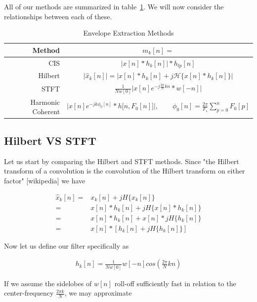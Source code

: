 \documentclass [11pt, proquest,oneside] {ganter_thesis}[2015/03/03]
\begin{document}
All of our methods are summarized in table~\ref{table:envelope_extraction_methods}.  We will now consider the relationships between each of these.

\begin{table}
\begin{center}
\begin{tabular}{| r | c |}
  \hline
  \textbf{Method} & $m_k[n] = $ \\ \hline
  CIS & $\Big| x[n] * h_k[n] \Big| * h_{lp}[n]$ \\ \hline
  Hilbert & $\Big| \widehat{x}_k[n] \Big| = \Big| x[n] * h_k[n] + j\mathcal{H}\{x[n] * h_k[n]\} \Big|$ \\ \hline
  STFT & $\frac{1}{Nw[0]}  \Big\vert x[n] e^{-j\frac{2\pi}{N}kn} * w[-n] \Big\vert$ \\ \hline
  Harmonic Coherent & $\Big| x[n] e^{-jk\phi_0 [n]} * h\big[n, F_0[n] \big] \Big|, \qquad \phi_0[n] = \frac{2\pi}{F_s} \sum_{p=0}^{n} F_0[p]$ \\ \hline
\end{tabular}
\end{center}
\caption{Envelope Extraction Methods}\label{table:envelope_extraction_methods}
\end{table}

\subsection{Hilbert VS STFT}

Let us start by comparing the Hilbert and STFT methods.  Since "the Hilbert transform of a convolution is the convolution of the Hilbert transform on either factor" [wikipedia] we have 

\begin{align}
\label{eq:x_analytic}
\widehat{x}_k[n] =& x_k[n] + jH\{x_k[n]\} \nonumber \\
=& x[n] * h_k[n] + jH\{x[n] * h_k[n]\} \nonumber \\
=& x[n] * h_k[n] + x[n] * jH\{h_k[n]\} \nonumber \\
=& x[n] * [h_k[n]+  jH\{h_k[n]\}]
\end{align}

Now let us define our filter specifically as

\begin{align}
\label{eq:hilbert_constrained_filter}
h_k[n] = \frac{1}{Nw[0]}w[-n]cos(\frac{2\pi}{N}kn)
\end{align}

If we assume the sidelobes of $w[n]$ roll-off sufficiently fast in relation to the center-frequency $\frac{2\pi k}{N}$, we may approximate
\end{document}
